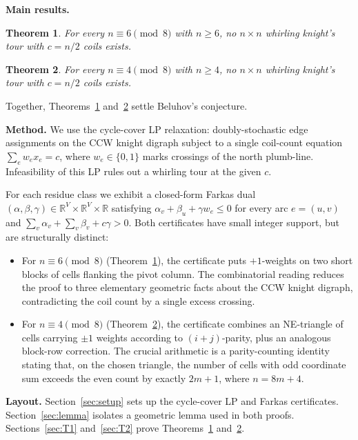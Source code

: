 \documentclass[11pt]{article}
\theoremstyle{plain}
\newtheorem{theorem}{Theorem}
\theoremstyle{remark}
\newcommand{\R}{\mathbb{R}}
\begin{document}
\medskip\noindent\textbf{Main results.}
\begin{theorem}\label{thm:T1}
For every $n\equiv 6\pmod 8$ with $n\ge 6$, no $n\times n$ whirling
knight's tour with $c=n/2$ coils exists.
\end{theorem}

\begin{theorem}\label{thm:T2}
For every $n\equiv 4\pmod 8$ with $n\ge 4$, no $n\times n$ whirling
knight's tour with $c=n/2$ coils exists.
\end{theorem}

Together, Theorems~\ref{thm:T1} and~\ref{thm:T2} settle Beluhov's
conjecture.

\medskip\noindent\textbf{Method.}
We use the cycle-cover LP relaxation: doubly-stochastic edge
assignments on the CCW knight digraph subject to a single coil-count
equation $\sum_e w_e x_e=c$, where $w_e\in\{0,1\}$ marks crossings of
the north plumb-line.  Infeasibility of this LP rules out a whirling
tour at the given $c$.

For each residue class we exhibit a closed-form Farkas dual
$(\alpha,\beta,\gamma)\in\R^V\times\R^V\times\R$ satisfying
$\alpha_v+\beta_u+\gamma w_e\le 0$ for every arc $e=(u,v)$ and
$\sum_v\alpha_v+\sum_v\beta_v+c\gamma>0$.  Both certificates have
small integer support, but are structurally distinct:
\begin{itemize}
\item For $n\equiv 6\pmod 8$ (Theorem~\ref{thm:T1}), the certificate
puts $+1$-weights on two short blocks of cells flanking the pivot
column.  The combinatorial reading reduces the proof to three
elementary geometric facts about the CCW knight digraph,
contradicting the coil count by a single excess crossing.
\item For $n\equiv 4\pmod 8$ (Theorem~\ref{thm:T2}), the certificate
combines an NE-triangle of cells carrying $\pm 1$ weights according to
$(i+j)$-parity, plus an analogous block-row correction.  The crucial
arithmetic is a parity-counting identity stating that, on the chosen
triangle, the number of cells with odd coordinate sum exceeds the
even count by exactly $2m+1$, where $n=8m+4$.
\end{itemize}

\medskip\noindent\textbf{Layout.}
Section~\ref{sec:setup} sets up the cycle-cover LP and Farkas
certificates.  Section~\ref{sec:lemma} isolates a geometric lemma
used in both proofs.  Sections~\ref{sec:T1} and~\ref{sec:T2} prove
Theorems~\ref{thm:T1} and~\ref{thm:T2}.
\end{document}
